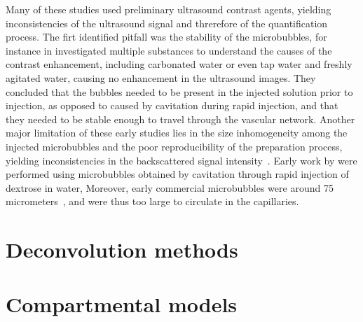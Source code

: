Many of these studies used preliminary ultrasound contrast agents, yielding inconsistencies of the ultrasound signal and threrefore of the quantification process. 
The firt identified pitfall was the stability of the microbubbles, for instance in \citeyear{Meltzer:1980ul} \citet{Meltzer:1980ul} investigated multiple substances to understand the causes of the contrast enhancement, including carbonated water or even tap water and freshly agitated water, causing no enhancement in the ultrasound images. 
They concluded that the bubbles needed to be present in the injected solution prior to injection, as opposed to caused by cavitation during rapid injection, and that they needed to be stable enough to travel through the vascular network.
Another major limitation of these early studies lies in the size inhomogeneity among the injected microbubbles and the poor reproducibility of the preparation process, yielding inconsistencies in the backscattered signal intensity~\cite{Morse:1968vl,deJong:1993cr,Wiencek:1993hr}.
Early work by \citet{Bommer:1978eu} were performed using microbubbles obtained by cavitation through rapid injection of dextrose in water, 
Moreover, early commercial microbubbles were around 75 micrometers~\cite{Meltzer:1980ul,Carroll:1980vp}, and were thus too large to circulate in the capillaries.


\section{Deconvolution methods}
\label{sec:DeconvolutionMethods}
\section{Compartmental models}
\label{sec:CompartmentalModels}




